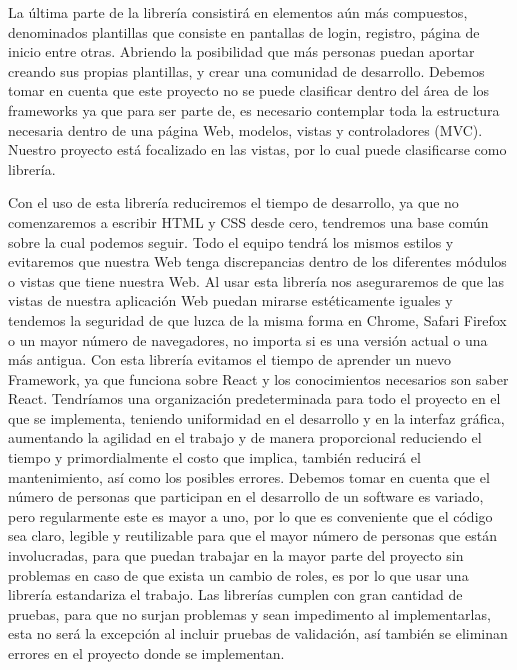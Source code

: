 La última parte de la librería consistirá en elementos aún más compuestos, denominados plantillas que consiste en pantallas de login, registro, página de inicio entre otras. Abriendo la posibilidad que más personas puedan aportar creando sus propias plantillas, y crear una comunidad de desarrollo.  
Debemos tomar en cuenta que este proyecto no se puede clasificar dentro del área de los frameworks ya que para ser parte de, es necesario contemplar toda la estructura necesaria dentro de una página Web, modelos, vistas y controladores (MVC). Nuestro proyecto está focalizado en las vistas, por lo cual puede clasificarse como librería.  
  
Con el uso de esta librería reduciremos el tiempo de desarrollo, ya que no comenzaremos a escribir HTML y  CSS desde cero, tendremos una base común sobre la cual podemos seguir. Todo el equipo tendrá los mismos estilos y evitaremos que nuestra Web tenga discrepancias dentro de los diferentes módulos o vistas que tiene nuestra Web. 
Al usar esta librería nos aseguraremos de que las vistas de nuestra aplicación Web puedan mirarse estéticamente iguales y tendemos la seguridad de que luzca de la misma forma en Chrome, Safari Firefox o un mayor número de navegadores, no importa si es una versión actual o una más antigua. 
Con esta librería evitamos el tiempo de aprender un nuevo Framework, ya que funciona sobre React y los conocimientos necesarios son saber React. 
Tendríamos una organización predeterminada para todo el proyecto en el que se implementa, teniendo uniformidad en el desarrollo y en la interfaz gráfica, aumentando la agilidad en el trabajo y de manera proporcional reduciendo el tiempo y primordialmente el costo que implica, también reducirá el mantenimiento, así como los posibles errores. 
Debemos tomar en cuenta que el número de personas que participan en el desarrollo de un software es variado, pero regularmente este es mayor a uno, por lo que es conveniente que el código sea claro, legible y reutilizable para que el mayor número de personas que están involucradas, para que puedan trabajar en la mayor parte del proyecto sin problemas en caso de que exista un cambio de roles, es por lo que usar una librería estandariza el trabajo. 
Las librerías cumplen con gran cantidad de pruebas, para que no surjan problemas y sean impedimento al implementarlas, esta no será la excepción al incluir pruebas de validación, así también se eliminan errores en el proyecto donde se implementan. 
  
